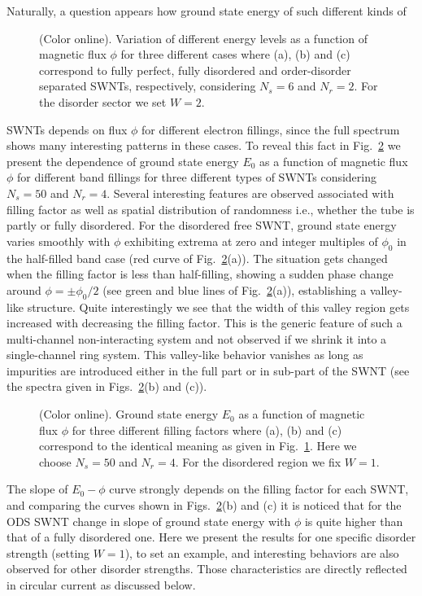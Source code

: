 \documentclass[prb,aps,twocolumn,amsmath,amssymb,floatfix,
superscriptaddress]{revtex4}
\begin{document}
Naturally, a question appears how ground state energy of such different kinds of
\begin{figure}[ht]
{\centering {}\par}
\caption{(Color online). Variation of different energy levels as a function 
of magnetic flux $\phi$ for three different cases where (a), (b) and (c)
correspond to fully perfect, fully disordered and order-disorder separated
SWNTs, respectively, considering $N_s = 6$ and $N_r = 2$. For the disorder
sector we set $W = 2$.}
\label{fig2}
\end{figure}
SWNTs depends on flux $\phi$ for different electron fillings, since the full 
spectrum shows many interesting patterns in these cases. To reveal this fact 
in Fig.~\ref{fig3} we present the dependence of ground state energy $E_0$ as a
function of magnetic flux $\phi$ for different band fillings for three 
different types of SWNTs considering $N_s=50$ and $N_r=4$. Several 
interesting features are observed associated with filling factor as well as 
spatial distribution of randomness i.e., whether the tube is partly or fully 
disordered. For the disordered free SWNT, ground state energy varies 
smoothly with $\phi$ exhibiting extrema at zero and integer multiples of 
$\phi_0$ in the half-filled band case 
(red curve of Fig.~\ref{fig3}(a)). The situation gets changed 
when the filling factor is less than half-filling, showing a sudden phase change 
around $\phi=\pm \phi_0/2$ (see green and blue lines of Fig.~\ref{fig3}(a)),
establishing a valley-like structure. Quite interestingly we see that the width
of this valley region gets increased with decreasing the filling factor. This is
the generic feature of such a multi-channel non-interacting system and not 
observed if we shrink it into a single-channel ring system. This valley-like 
behavior vanishes as long as impurities are introduced either in the full part 
or in sub-part of the SWNT (see the spectra given in Figs.~\ref{fig3}(b) 
and (c)). 
\begin{figure}[ht]
{\centering {}\par}
\caption{(Color online). Ground state energy $E_0$ as a function of magnetic flux 
$\phi$ for three different filling factors where (a), (b) and (c) correspond 
to the identical meaning as given in Fig.~\ref{fig2}. Here we choose $N_s = 50$
and $N_r = 4$. For the disordered region we fix $W=1$.}
\label{fig3}
\end{figure}
The slope of $E_0-\phi$ curve strongly depends on the filling factor for each 
SWNT, and comparing the curves shown in Figs.~\ref{fig3}(b) and (c) it 
is noticed that for the ODS SWNT change in slope of ground state energy 
with $\phi$ is quite higher than that of a fully disordered one. Here we present 
the results for one 
specific disorder strength (setting $W=1$), to set an example, and interesting 
behaviors are also observed for other disorder strengths. Those characteristics 
are directly reflected in circular current as discussed below.
\end{document}
